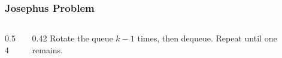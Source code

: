 \documentclass[aspectratio=169,10pt,compress]{beamer}
\begin{document}
\begin{frame}[t,fragile]\frametitle{Josephus Problem}
  \begin{columns}[T]
    \begin{column}{0.54\textwidth}
    \end{column}
    \begin{column}{0.42\textwidth}
      \small
      Rotate the queue $k-1$ times, then dequeue. Repeat until one remains.
    \end{column}
  \end{columns}
\end{frame}

\begin{frame}[t,fragile]
  \begin{center}\vspace{4cm}\end{center}
\end{frame}
\end{document}
